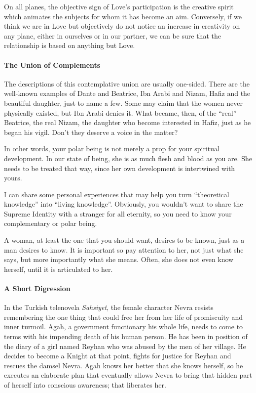 \begin{quotex}
On all planes, the objective sign of Love's participation is the creative spirit which animates the subjects for whom it has become an aim. Conversely, if we think we are in Love but objectively do not notice an increase in creativity on any plane, either in ourselves or in our partner, we can be sure that the relationship is based on anything but Love. 

\end{quotex}
\paragraph{The Union of Complements}
The descriptions of this contemplative union are usually one-sided. There are the well-known examples of Dante and Beatrice, Ibn Arabi and Nizam, Hafiz and the beautiful daughter, just to name a few. Some may claim that the women never physically existed, but Ibn Arabi denies it. What became, then, of the “real” Beatrice, the real Nizam, the daughter who become interested in Hafiz, just as he began his vigil. Don't they deserve a voice in the matter?

In other words, your polar being is not merely a prop for your spiritual development. In our state of being, she is as much flesh and blood as you are. She needs to be treated that way, since her own development is intertwined with yours.

I can share some personal experiences that may help you turn “theoretical knowledge” into “living knowledge”. Obviously, you wouldn't want to share the Supreme Identity with a stranger for all eternity, so you need to know your complementary or polar being.

A woman, at least the one that you should want, desires to be known, just as a man desires to know. It is important so pay attention to her, not just what she says, but more importantly what she means. Often, she does not even know herself, until it is articulated to her.

\paragraph{A Short Digression}
In the Turkish telenovela \emph{Sahsiyet}, the female character Nevra resists remembering the one thing that could free her from her life of promiscuity and inner turmoil. Agah, a government functionary his whole life, needs to come to terms with his impending death of his human person. He has been in position of the diary of a girl named Reyhan who was abused by the men of her village. He decides to become a Knight at that point, fights for justice for Reyhan and rescues the damsel Nevra. Agah knows her better that she knows herself, so he executes an elaborate plan that eventually allows Nevra to bring that hidden part of herself into conscious awareness; that liberates her.

